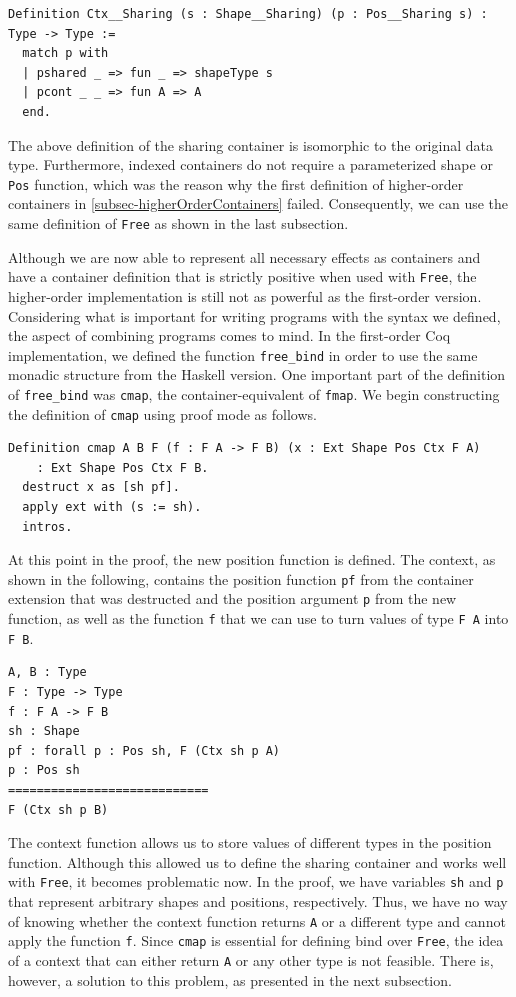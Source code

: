 \documentclass[a4paper, 11pt, fleqn, twoside]{scrreprt}
\newcommand{\cinl}[1]{\texttt{#1}}
\begin{document}
\begin{verbatim}
Definition Ctx__Sharing (s : Shape__Sharing) (p : Pos__Sharing s) : Type -> Type :=
  match p with
  | pshared _ => fun _ => shapeType s
  | pcont _ _ => fun A => A
  end.
\end{verbatim}

The above definition of the sharing container is isomorphic to the original data type.
Furthermore, indexed containers do not require a parameterized shape or \cinl{Pos} function, which was the reason why the first definition of higher-order containers in \autoref{subsec-higherOrderContainers} failed.
Consequently, we can use the same definition of \cinl{Free} as shown in the last subsection.

Although we are now able to represent all necessary effects as containers and have a container definition that is strictly positive when used with \cinl{Free}, the higher-order implementation is still not as powerful as the first-order version.
Considering what is important for writing programs with the syntax we defined, the aspect of combining programs comes to mind.
In the first-order Coq implementation, we defined the function \cinl{free_bind} in order to use the same monadic structure from the Haskell version.
One important part of the definition of \cinl{free_bind} was \cinl{cmap}, the container-equivalent of \cinl{fmap}.
We begin constructing the definition of \cinl{cmap} using proof mode as follows.

\begin{verbatim}
Definition cmap A B F (f : F A -> F B) (x : Ext Shape Pos Ctx F A) 
    : Ext Shape Pos Ctx F B.
  destruct x as [sh pf].
  apply ext with (s := sh).
  intros.
\end{verbatim}

At this point in the proof, the new position function is defined.
The context, as shown in the following, contains the position function \cinl{pf} from the container extension that was destructed and the position argument \cinl{p} from the new function, as well as the function \cinl{f} that we can use to turn values of type \cinl{F A} into \cinl{F B}.

\begin{verbatim}
A, B : Type
F : Type -> Type
f : F A -> F B
sh : Shape
pf : forall p : Pos sh, F (Ctx sh p A)
p : Pos sh
============================
F (Ctx sh p B)
\end{verbatim}

The context function allows us to store values of different types in the position function.
Although this allowed us to define the sharing container and works well with \cinl{Free}, it becomes problematic now.
In the proof, we have variables \cinl{sh} and \cinl{p} that represent arbitrary shapes and positions, respectively.
Thus, we have no way of knowing whether the context function returns \cinl{A} or a different type and cannot apply the function \cinl{f}.
Since \cinl{cmap} is essential for defining bind over \cinl{Free}, the idea of a context that can either return \cinl{A} or any other type is not feasible.
There is, however, a solution to this problem, as presented in the next subsection.
\end{document}
